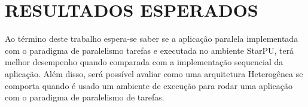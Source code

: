 
\chapter{RESULTADOS ESPERADOS}
\label{chap:resultados-esperados}

Ao término deste trabalho espera-se saber se a aplicação paralela implementada com o paradigma de paralelismo tarefas e executada no ambiente StarPU, terá melhor desempenho quando comparada com a implementação sequencial da aplicação. Além disso, será possível avaliar como uma arquitetura Heterogênea se comporta quando é usado um ambiente de execução para rodar uma aplicação com o paradigma de paralelismo de tarefas.